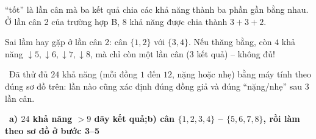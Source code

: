 \documentclass[11pt]{article}
\providecommand{\AnsWord}{Đáp số}
\newcommand{\ans}[1]{\par\smallskip{\bfseries\color{tmGreen!88!black}\AnsWord:}\ {\bfseries\color{AnsRed}#1}\par}
\newcommand{\verify}[1]{\par\smallskip\noindent{\bfseries\color{tmGreen!80!black}\faCheckCircle\ \CheckWord}\ #1\par}
\def\AnsWord{Đáp số}
\def\CheckWord{Thử lại:}
\begin{document}
{\begin{tipbox}
``tốt'' là lần cân mà ba kết quả chia các khả năng thành ba phần gần bằng nhau. Ở lần cân 2 của trường hợp B, $8$ khả năng được chia
thành $3 + 3 + 2$.\end{tipbox}
\begin{warnbox}Sai lầm hay gặp ở lần cân 2: cân $\{1, 2\}$ với $\{3, 4\}$. Nếu thăng bằng, còn $4$ khả năng
$\downarrow 5, \downarrow 6, \downarrow 7, \downarrow 8$, mà chỉ còn một lần cân ($3$ kết quả) -- không đủ!\end{warnbox}
\verify{Đã thử đủ $24$ khả năng (mỗi đồng $1$ đến $12$, nặng hoặc nhẹ) bằng máy tính theo đúng sơ đồ trên: lần nào cũng xác định
đúng đồng giả và đúng ``nặng/nhẹ'' sau $3$ lần cân.}
\ans{a) $24$ khả năng $> 9$ dãy kết quả;\quad b) cân $\{1,2,3,4\}$ -- $\{5,6,7,8\}$, rồi làm theo sơ đồ ở bước 3--5}
}

\end{document}
